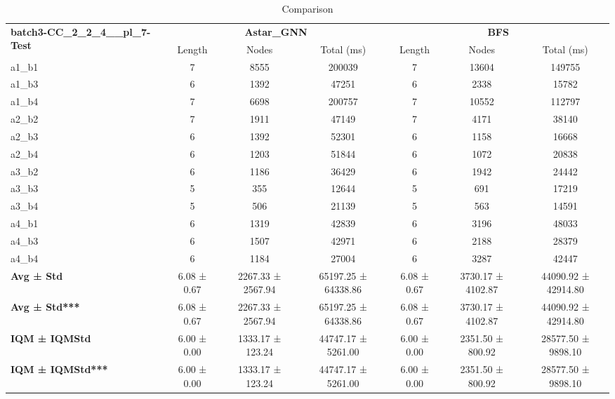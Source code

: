 \begin{table}[!ht]
\centering
\small
\begin{tabular}{l|ccc|ccc}
\multirow{2}{*}{\textbf{batch3-CC\_2\_2\_4\_\_pl\_7-Test}} & \multicolumn{3}{c|}{\textbf{Astar\_GNN}} & \multicolumn{3}{c}{\textbf{BFS}} \\
\cline{2-7}
& Length & Nodes & Total (ms) & Length & Nodes & Total (ms) \\
\hline
a1\_b1 & 7 & 8555 & 200039 & 7 & 13604 & 149755 \\
a1\_b3 & 6 & 1392 & 47251 & 6 & 2338 & 15782 \\
a1\_b4 & 7 & 6698 & 200757 & 7 & 10552 & 112797 \\
a2\_b2 & 7 & 1911 & 47149 & 7 & 4171 & 38140 \\
a2\_b3 & 6 & 1392 & 52301 & 6 & 1158 & 16668 \\
a2\_b4 & 6 & 1203 & 51844 & 6 & 1072 & 20838 \\
a3\_b2 & 6 & 1186 & 36429 & 6 & 1942 & 24442 \\
a3\_b3 & 5 & 355 & 12644 & 5 & 691 & 17219 \\
a3\_b4 & 5 & 506 & 21139 & 5 & 563 & 14591 \\
a4\_b1 & 6 & 1319 & 42839 & 6 & 3196 & 48033 \\
a4\_b3 & 6 & 1507 & 42971 & 6 & 2188 & 28379 \\
a4\_b4 & 6 & 1184 & 27004 & 6 & 3287 & 42447 \\
\hline
\textbf{Avg ± Std} & 6.08 ± 0.67 & 2267.33 ± 2567.94 & 65197.25 ± 64338.86 & 6.08 ± 0.67 & 3730.17 ± 4102.87 & 44090.92 ± 42914.80 \\
\textbf{Avg ± Std***} & 6.08 ± 0.67 & 2267.33 ± 2567.94 & 65197.25 ± 64338.86 & 6.08 ± 0.67 & 3730.17 ± 4102.87 & 44090.92 ± 42914.80 \\
\textbf{IQM ± IQMStd} & 6.00 ± 0.00 & 1333.17 ± 123.24 & 44747.17 ± 5261.00 & 6.00 ± 0.00 & 2351.50 ± 800.92 & 28577.50 ± 9898.10 \\
\textbf{IQM ± IQMStd***} & 6.00 ± 0.00 & 1333.17 ± 123.24 & 44747.17 ± 5261.00 & 6.00 ± 0.00 & 2351.50 ± 800.92 & 28577.50 ± 9898.10 \\
\end{tabular}
\caption{Comparison}
\label{tab:batch3_CC_2_2_4__pl_7_comparison_test}
\end{table}
